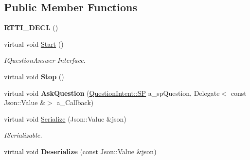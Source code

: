\subsection*{Public Member Functions}
\begin{DoxyCompactItemize}
\item 
\mbox{\label{class_dialog_n_l_c_proxy_a1b6b689517b0103a5d0b0a3b4b7fafba}} 
{\bfseries R\+T\+T\+I\+\_\+\+D\+E\+CL} ()
\item 
\mbox{\label{class_dialog_n_l_c_proxy_abc5a3b5cede5d67fc8f593f32d5a008b}} 
virtual void \hyperlink{class_dialog_n_l_c_proxy_abc5a3b5cede5d67fc8f593f32d5a008b}{Start} ()
\begin{DoxyCompactList}\small\item\em I\+Question\+Answer Interface. \end{DoxyCompactList}\item 
\mbox{\label{class_dialog_n_l_c_proxy_ae341782818f10ba385d53876294ce4b2}} 
virtual void {\bfseries Stop} ()
\item 
\mbox{\label{class_dialog_n_l_c_proxy_a4fbafd1ebce6010f2c1b9e5260dac76e}} 
virtual void {\bfseries Ask\+Question} (\hyperlink{class_question_intent_a250dceb08e1342574a0aca4fe40a7121}{Question\+Intent\+::\+SP} a\+\_\+sp\+Question, Delegate$<$ const Json\+::\+Value \&$>$ a\+\_\+\+Callback)
\item 
\mbox{\label{class_dialog_n_l_c_proxy_abf3fd819768c9502ebfa8a995ae14e6b}} 
virtual void \hyperlink{class_dialog_n_l_c_proxy_abf3fd819768c9502ebfa8a995ae14e6b}{Serialize} (Json\+::\+Value \&json)
\begin{DoxyCompactList}\small\item\em I\+Serializable. \end{DoxyCompactList}\item 
\mbox{\label{class_dialog_n_l_c_proxy_a6940d780855d08e154fcc2d3f21504bc}} 
virtual void {\bfseries Deserialize} (const Json\+::\+Value \&json)
\item 
\mbox{\label{class_dialog_n_l_c_proxy_a1ebe5b56a302b75e03d85355f6904084}} 

\end{DoxyCompactItemize}

